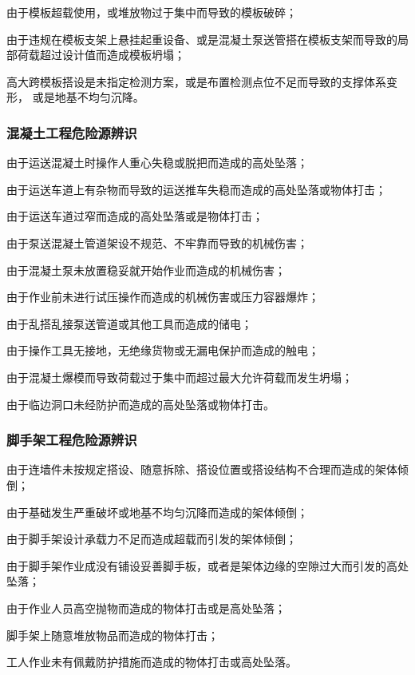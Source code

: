 由于模板超载使用，或堆放物过于集中而导致的模板破碎；

 由于违规在模板支架上悬挂起重设备、或是混凝土泵送管搭在模板支架而导致的局部荷载超过设计值而造成模板坍塌；

 高大跨模板搭设是未指定检测方案，或是布置检测点位不足而导致的支撑体系变形，
或是地基不均匀沉降。

\subsubsection{混凝土工程危险源辨识}

 由于运送混凝土时操作人重心失稳或脱把而造成的高处坠落；

 由于运送车道上有杂物而导致的运送推车失稳而造成的高处坠落或物体打击；

 由于运送车道过窄而造成的高处坠落或是物体打击；

 由于泵送混凝土管道架设不规范、不牢靠而导致的机械伤害；

 由于混凝土泵未放置稳妥就开始作业而造成的机械伤害；

 由于作业前未进行试压操作而造成的机械伤害或压力容器爆炸；

 由于乱搭乱接泵送管道或其他工具而造成的储电；

 由于操作工具无接地，无绝缘货物或无漏电保护而造成的触电；

 由于混凝土爆模而导致荷载过于集中而超过最大允许荷载而发生坍塌；

 由于临边洞口未经防护而造成的高处坠落或物体打击。

\subsubsection{脚手架工程危险源辨识}

 由于连墙件未按规定搭设、随意拆除、搭设位置或搭设结构不合理而造成的架体倾倒；

 由于基础发生严重破坏或地基不均匀沉降而造成的架体倾倒；

 由于脚手架设计承载力不足而造成超载而引发的架体倾倒；

 由于脚手架作业成没有铺设妥善脚手板，或者是架体边缘的空隙过大而引发的高处坠落；

 由于作业人员高空抛物而造成的物体打击或是高处坠落；

 脚手架上随意堆放物品而造成的物体打击；

 工人作业未有佩戴防护措施而造成的物体打击或高处坠落。

